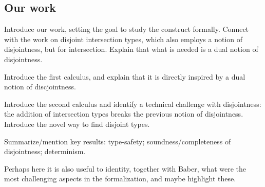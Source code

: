 \subsection{Our work}


Introduce our work, setting the goal to study the construct formally.
Connect with the work on disjoint intersection types, which also
employs a notion of disjointness, but for intersection. Explain that
what is needed is a dual notion of disjointness.

Introduce the first calculus, and explain that it is directly inspired
by a dual notion of discjointness.

Introduce the second calculus and identify a technical challenge with
disjointness: the addition of intersection types breaks the previous
notion of disjointness. Introduce the novel way to find disjoint types.

Summarize/mention key results: type-safety; soundness/completeness of
disjointness; determinism.

Perhaps here it is also useful to identity, together with Baber, what
were the most challenging aspects in the formalization, and maybe
highlight these.

